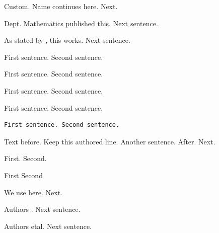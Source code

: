 
Custom. Name continues
here. Next.

Dept. Mathematics published this. Next sentence.

As stated by
, this works. Next sentence.

\begin{frame}
First sentence. Second sentence.
\end{frame}

\begin{minipage}{0.5\textwidth}
First sentence. Second sentence.
\end{minipage}

\begin{mytheorem}
First sentence. Second sentence.
\end{mytheorem}

\begin{unknown}
First sentence. Second sentence.
\end{unknown}

\begin{verbatim}
First sentence. Second sentence.
\end{verbatim}

Text before.
 Keep this authored line. Another sentence.
After. Next.

\newenvironment{local}{}{}
\begin{local}
First. Second.
\end{local}

\begin{itemize}
\myitem First
\myitem Second
\end{itemize}

We use
here. Next.

Authors \etal. Next sentence.

Authors etal. Next sentence.
